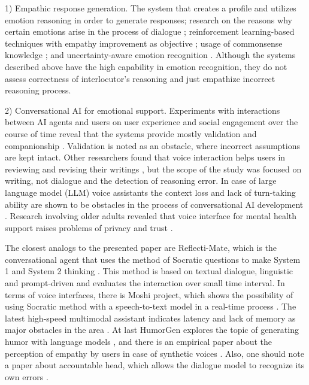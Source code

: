 \documentclass[conference]{IEEEtran}
\begin{document}
1) Empathic response generation. The system that creates a profile and utilizes emotion reasoning \cite{r2} in order to generate responses; research on the reasons why certain emotions arise in the process of dialogue \cite{r3}; reinforcement learning-based techniques with empathy improvement as objective \cite{r4}; usage of commonsense knowledge \cite{r5}; and uncertainty-aware emotion recognition \cite{r6}. Although the systems described above have the high capability in emotion recognition, they do not assess correctness of interlocutor's reasoning and just empathize incorrect reasoning process.

2) Conversational AI for emotional support. Experiments with interactions between AI agents and users on user experience and social engagement over the course of time reveal that the systems provide mostly validation and companionship \cite{r7,r8}. Validation is noted as an obstacle, where incorrect assumptions are kept intact. Other researchers found that voice interaction helps users in reviewing and revising their writings \cite{r9}, but the scope of the study was focused on writing, not dialogue and the detection of reasoning error. In case of large language model (LLM) voice assistants the context loss and lack of turn-taking ability are shown to be obstacles in the process of conversational AI development \cite{r10}. Research involving older adults revealed that voice interface for mental health support raises problems of privacy and trust \cite{r11}.

The closest analogs to the presented paper are Reflecti-Mate, which is the conversational agent that uses the method of Socratic questions to make System 1 and System 2 thinking \cite{r12}. This method is based on textual dialogue, linguistic and prompt-driven and evaluates the interaction over small time interval. In terms of voice interfaces, there is Moshi project, which shows the possibility of using Socratic method with a speech-to-text model in a real-time process \cite{r13}. The latest high-speed multimodal assistant indicates latency and lack of memory as major obstacles in the area \cite{r14}. At last HumorGen explores the topic of generating humor with language models \cite{r15}, and there is an empirical paper about the perception of empathy by users in case of synthetic voices \cite{r16}. Also, one should note a paper about accountable head, which allows the dialogue model to recognize its own errors \cite{r17}.
\end{document}
